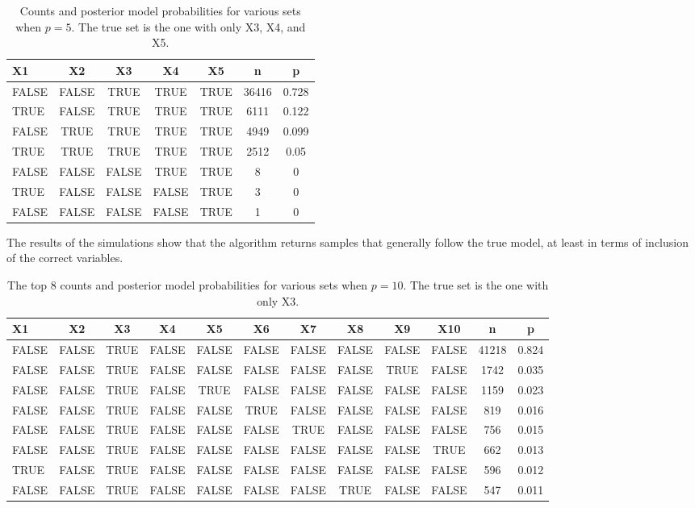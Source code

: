 \documentclass{article}
\begin{document}
\begin{table}[H]
    \centering
  \caption{Counts and posterior model probabilities for various sets when $p = 5$. The true set is the one with only X3, X4, and X5.}
  \begin{tabular}{| l c  c  c  c  c c |}
  \hline
  X1 & X2 & X3 & X4 & X5 & n & p \\
  \hline
FALSE  & FALSE  & TRUE  & TRUE  & TRUE  & 36416  & 0.728  \\
TRUE  & FALSE  & TRUE  & TRUE  & TRUE  & 6111  & 0.122  \\
FALSE  & TRUE  & TRUE  & TRUE  & TRUE  & 4949  & 0.099  \\
TRUE  & TRUE  & TRUE  & TRUE  & TRUE  & 2512  & 0.05  \\
FALSE  & FALSE  & FALSE  & TRUE  & TRUE  & 8  & 0  \\
TRUE  & FALSE  & FALSE  & FALSE  & TRUE  & 3  & 0  \\
FALSE  & FALSE  & FALSE  & FALSE  & TRUE  & 1  & 0  \\
\hline
\end{tabular}
\label{tab:prior_table_class}
\end{table}

The results of the simulations show that the algorithm returns samples that generally follow the true model, at least in terms of inclusion of the correct variables.

\begin{table}[H]
    \centering
  \caption{The top 8 counts and posterior model probabilities for various sets when $p = 10$. The true set is the one with only X3.}
  \begin{tabular}{| l c  c  c  c  c c c c c c c|}
  \hline
  X1 & X2 & X3 & X4 & X5 & X6 & X7 & X8 & X9 & X10 & n & p \\
  \hline
FALSE  & FALSE  & TRUE  & FALSE  & FALSE  & FALSE  & FALSE  & FALSE  & FALSE  & FALSE  & 41218  & 0.824  \\
FALSE  & FALSE  & TRUE  & FALSE  & FALSE  & FALSE  & FALSE  & FALSE  & TRUE  & FALSE  & 1742  & 0.035  \\
FALSE  & FALSE  & TRUE  & FALSE  & TRUE  & FALSE  & FALSE  & FALSE  & FALSE  & FALSE  & 1159  & 0.023  \\
FALSE  & FALSE  & TRUE  & FALSE  & FALSE  & TRUE  & FALSE  & FALSE  & FALSE  & FALSE  & 819  & 0.016  \\
FALSE  & FALSE  & TRUE  & FALSE  & FALSE  & FALSE  & TRUE  & FALSE  & FALSE  & FALSE  & 756  & 0.015  \\
FALSE  & FALSE  & TRUE  & FALSE  & FALSE  & FALSE  & FALSE  & FALSE  & FALSE  & TRUE  & 662  & 0.013  \\
TRUE  & FALSE  & TRUE  & FALSE  & FALSE  & FALSE  & FALSE  & FALSE  & FALSE  & FALSE  & 596  & 0.012  \\
FALSE  & FALSE  & TRUE  & FALSE  & FALSE  & FALSE  & FALSE  & TRUE  & FALSE  & FALSE  & 547  & 0.011  \\
\hline
\end{tabular}
\end{table}
\end{document}
